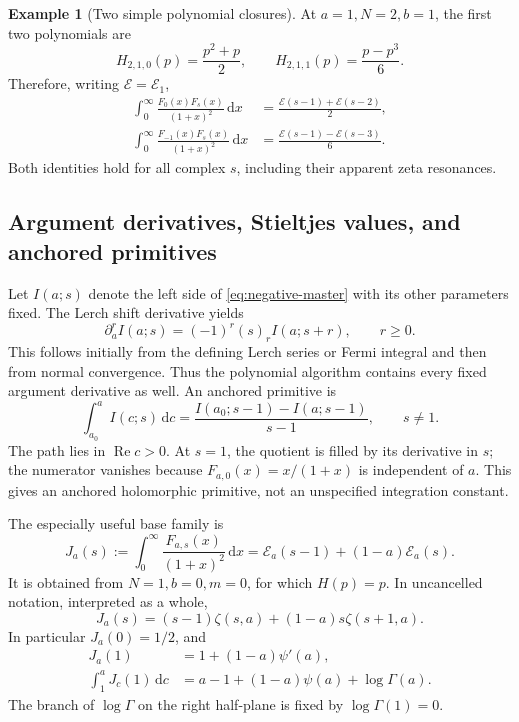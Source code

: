 \documentclass[11pt]{article}
\numberwithin{equation}{section}
\theoremstyle{definition}
\newtheorem{example}[theorem]{Example}
\DeclareMathOperator{\Rea}{Re}
\newcommand{\dd}{\,\mathrm d}
\newcommand{\EE}{\mathcal E}
\begin{document}
\begin{example}[Two simple polynomial closures]
At $a=1,N=2,b=1$, the first two polynomials are
\[
 H_{2,1,0}(p)=\frac{p^2+p}{2},\qquad
 H_{2,1,1}(p)=\frac{p-p^3}{6}.
\]
Therefore, writing $\EE=\EE_1$,
\begin{align}
 \int_0^\infty\frac{F_0(x)F_s(x)}{(1+x)^2}\dd x
 &=\frac{\EE(s-1)+\EE(s-2)}2,\label{eq:negative-ex0}\\
 \int_0^\infty\frac{F_{-1}(x)F_s(x)}{(1+x)^2}\dd x
 &=\frac{\EE(s-1)-\EE(s-3)}6.\label{eq:negative-ex1}
\end{align}
Both identities hold for all complex $s$, including their apparent zeta resonances.
\end{example}

\subsection{Argument derivatives, Stieltjes values, and anchored primitives}
Let $I(a;s)$ denote the left side of \eqref{eq:negative-master} with its other parameters fixed. The Lerch shift derivative yields
\begin{equation}\label{eq:argument-ladder}
 \partial_a^r I(a;s)=(-1)^r(s)_rI(a;s+r),\qquad r\ge0.
\end{equation}
This follows initially from the defining Lerch series or Fermi integral and then from normal convergence. Thus the polynomial algorithm contains every fixed argument derivative as well. An anchored primitive is
\begin{equation}\label{eq:argument-primitive}
 \int_{a_0}^a I(c;s)\dd c
 =\frac{I(a_0;s-1)-I(a;s-1)}{s-1},\qquad s\ne1.
\end{equation}
The path lies in $\Rea c>0$. At $s=1$, the quotient is filled by its derivative in $s$; the numerator vanishes because $F_{a,0}(x)=x/(1+x)$ is independent of $a$. This gives an anchored holomorphic primitive, not an unspecified integration constant.

The especially useful base family is
\begin{equation}\label{eq:J-base}
 J_a(s):=\int_0^\infty\frac{F_{a,s}(x)}{(1+x)^2}\dd x
 =\EE_a(s-1)+(1-a)\EE_a(s).
\end{equation}
It is obtained from $N=1,b=0,m=0$, for which $H(p)=p$. In uncancelled notation, interpreted as a whole,
\[
 J_a(s)=(s-1)\zeta(s,a)+(1-a)s\zeta(s+1,a).
\]
In particular $J_a(0)=1/2$, and
\begin{align}
 J_a(1)&=1+(1-a)\psi'(a),\label{eq:J1}\\
 \int_1^a J_c(1)\dd c
 &=a-1+(1-a)\psi(a)+\log\Gamma(a).\label{eq:J1-primitive}
\end{align}
The branch of $\log\Gamma$ on the right half-plane is fixed by $\log\Gamma(1)=0$.
\end{document}
